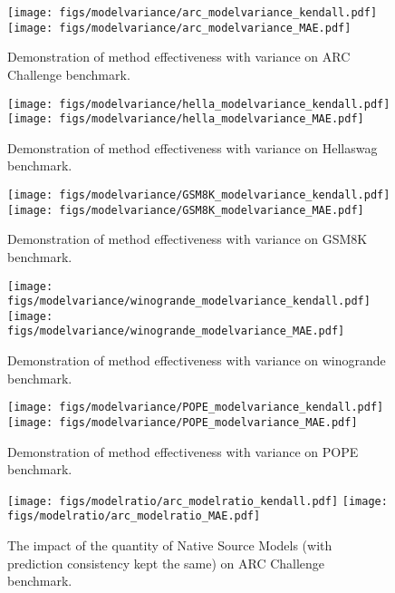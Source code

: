 \begin{figure*}[ht]
  \texttt{[image: figs/modelvariance/arc\_modelvariance\_kendall.pdf]} \hfill
  \texttt{[image: figs/modelvariance/arc\_modelvariance\_MAE.pdf]}
  \caption {Demonstration of method effectiveness with variance on ARC Challenge benchmark.}
\vspace{-0.3cm}
\label{Variance_arc}
\end{figure*}

\begin{figure*}[ht]
  \texttt{[image: figs/modelvariance/hella\_modelvariance\_kendall.pdf]} \hfill
  \texttt{[image: figs/modelvariance/hella\_modelvariance\_MAE.pdf]}
  \caption {Demonstration of method effectiveness with variance on Hellaswag benchmark.}
\vspace{-0.3cm}
\label{Variance_hella}
\end{figure*}

\begin{figure*}[ht]
  \texttt{[image: figs/modelvariance/GSM8K\_modelvariance\_kendall.pdf]} \hfill
  \texttt{[image: figs/modelvariance/GSM8K\_modelvariance\_MAE.pdf]}
  \caption {Demonstration of method effectiveness with variance on GSM8K benchmark.}
\vspace{-0.3cm}
\label{Variance_GSM8K}
\end{figure*}

\begin{figure*}[ht]
  \texttt{[image: figs/modelvariance/winogrande\_modelvariance\_kendall.pdf]} \hfill
  \texttt{[image: figs/modelvariance/winogrande\_modelvariance\_MAE.pdf]}
  \caption {Demonstration of method effectiveness with variance on winogrande benchmark.}
\vspace{-0.3cm}
\label{Variance_winogrande}
\end{figure*}

\begin{figure*}[ht]
  \texttt{[image: figs/modelvariance/POPE\_modelvariance\_kendall.pdf]} \hfill
  \texttt{[image: figs/modelvariance/POPE\_modelvariance\_MAE.pdf]}
  \caption {Demonstration of method effectiveness with variance on POPE benchmark.}
\vspace{-0.3cm}
\label{Variance_pope}
\end{figure*}

\begin{figure*}[ht]
  \texttt{[image: figs/modelratio/arc\_modelratio\_kendall.pdf]} \hfill
  \texttt{[image: figs/modelratio/arc\_modelratio\_MAE.pdf]}
  \caption {The impact of the quantity of Native Source Models (with
prediction consistency kept the same) on ARC Challenge benchmark.}
\vspace{-0.3cm}
\label{Quantity_arc}
\end{figure*}

